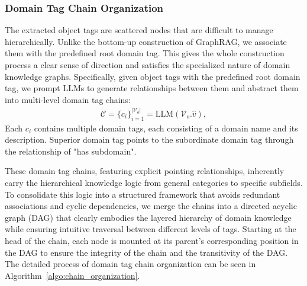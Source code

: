\documentclass[11pt]{article}
\begin{document}
\subsubsection{Domain Tag Chain Organization}
The extracted object tags are scattered nodes that are difficult to manage hierarchically.
Unlike the bottom-up construction of GraphRAG, we associate them with the predefined root domain tag. This gives the whole construction process a clear sense of direction and satisfies the specialized nature of domain knowledge graphs.
Specifically, given object tags with the predefined root domain tag, we prompt LLMs to generate relationships between them and abstract them into multi-level domain tag chains:
\begin{align*}
    \mathcal{C} = \{c_i\}_{i=1}^{\left | \mathcal{V}_o \right | } =  \text{LLM}(\mathcal{V}_o. \hat{v}),
\end{align*}
Each $c_i$ contains multiple domain tags, each consisting of a domain name and its description. Superior domain tag points to the subordinate domain tag through the relationship of "has subdomain".

These domain tag chains, featuring explicit pointing relationships, inherently carry the hierarchical knowledge logic from general categories to specific subfields. To consolidate this logic into a structured framework that avoids redundant associations and cyclic dependencies, we merge the chains into a directed acyclic graph (DAG) that clearly embodies the layered hierarchy of domain knowledge while ensuring intuitive traversal between different levels of tags.
Starting at the head of the chain, each node is mounted at its parent's corresponding position in the DAG to ensure the integrity of the chain and the transitivity of the DAG.
The detailed process of domain tag chain organization can be seen in Algorithm~\ref{algo:chain_organization}.
\end{document}
